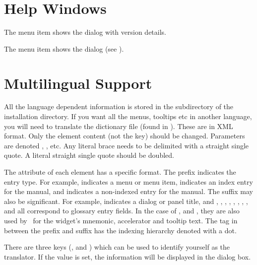 \chapter{Help Windows}
\label{sec:helpwindows}


The  menu item shows the 
dialog with version details.


The  menu item shows the 
dialog (see ).



\chapter{Multilingual Support}\label{sec:multilingualsupport}

All the language dependent information is stored in the
 subdirectory of the installation directory.
If you want all the menus, tooltips
etc in another language, you will need to translate the
dictionary file (found in ). 
These are in XML format. Only the element content (not the key)
should be changed. Parameters are denoted ,
, etc. Any literal brace needs to be delimited with
a straight single quote. A literal straight single quote should be
doubled.

The  attribute of each  element has a specific
format. The prefix indicates the entry type. For example,
 indicates a menu or menu item,  indicates an
index entry for the manual, and  indicates a
non-indexed entry for the manual.  The suffix may also be
significant. For example,  indicates a dialog or panel
title, and , , ,
, , , ,
, and  all correspond to glossary
entry fields. In the case of ,  and
, they are also used by \FlowframTk\ for the widget's
mnemonic, accelerator and tooltip text.  The tag in between the
prefix and suffix has the indexing hierarchy denoted with a dot.

There are three keys (,
 and )
which can be used to identify yourself as the translator. If
the  value is set, the information will be
displayed in the  dialog box.

